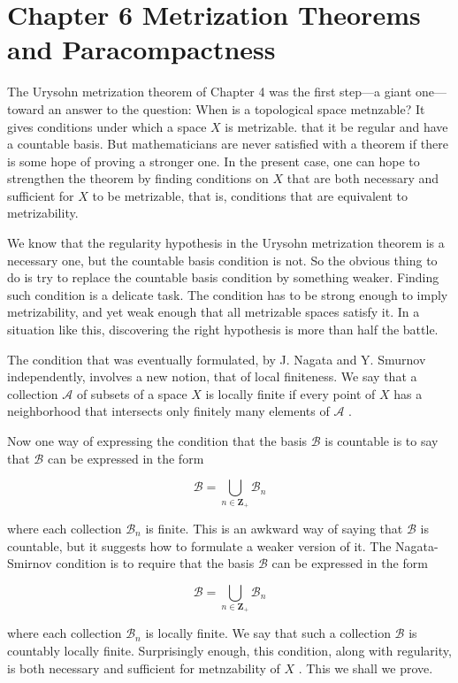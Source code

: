 \documentclass[10pt]{article}
\begin{document}
\section*{Chapter 6 Metrization Theorems and Paracompactness}

The Urysohn metrization theorem of Chapter 4 was the first step—a giant one—toward an answer to the question: When is a topological space metnzable? It gives conditions under which a space \(X\) is metrizable. that it be regular and have a countable basis. But mathematicians are never satisfied with a theorem if there is some hope of proving a stronger one. In the present case, one can hope to strengthen the theorem by finding conditions on \(X\) that are both necessary and sufficient for \(X\) to be metrizable, that is, conditions that are equivalent to metrizability.

We know that the regularity hypothesis in the Urysohn metrization theorem is a necessary one, but the countable basis condition is not. So the obvious thing to do is try to replace the countable basis condition by something weaker. Finding such condition is a delicate task. The condition has to be strong enough to imply metrizability, and yet weak enough that all metrizable spaces satisfy it. In a situation like this, discovering the right hypothesis is more than half the battle.

The condition that was eventually formulated, by J. Nagata and Y. Smurnov independently, involves a new notion, that of local finiteness. We say that a collection \(\mathcal{A}\) of subsets of a space \(X\) is locally finite if every point of \(X\) has a neighborhood that intersects only finitely many elements of \(\mathcal{A}\) .

Now one way of expressing the condition that the basis \(\mathcal{B}\) is countable is to say that \(\mathcal{B}\) can be expressed in the form

\[
\mathcal{B} = \mathop{\bigcup }\limits_{{n \in  {\mathbf{Z}}_{ + }}}{\mathcal{B}}_{n}
\]

where each collection \({\mathcal{B}}_{n}\) is finite. This is an awkward way of saying that \(\mathcal{B}\) is countable, but it suggests how to formulate a weaker version of it. The Nagata-Smirnov condition is to require that the basis \(\mathcal{B}\) can be expressed in the form

\[
\mathcal{B} = \mathop{\bigcup }\limits_{{n \in  {\mathbf{Z}}_{ + }}}{\mathcal{B}}_{n}
\]

where each collection \({\mathcal{B}}_{n}\) is locally finite. We say that such a collection \(\mathcal{B}\) is countably locally finite. Surprisingly enough, this condition, along with regularity, is both necessary and sufficient for metnzability of \(X\) . This we shall we prove.
\end{document}
